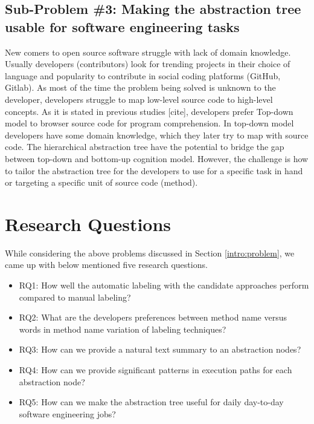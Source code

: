    

    \subsection{Sub-Problem \#3: Making the abstraction tree usable for software engineering tasks} 
    
    New comers to open source software struggle with lack of domain knowledge. Usually developers (contributors) look for trending projects in their choice of language and popularity to contribute in social coding platforms (GitHub, Gitlab). As most of the time the problem being solved is unknown to the developer, developers struggle to map low-level source code to high-level concepts. As it is stated in previous studies [cite], developers prefer Top-down model to browser source code for program comprehension. In top-down model developers have some domain knowledge, which they later try to map with source code. The hierarchical abstraction tree have the potential to bridge the gap between top-down and bottom-up cognition model. However, the challenge is how to tailor the abstraction tree for the developers to use for a specific task in hand or targeting a specific unit of source code (method). 
    
    
\section{Research Questions}   
\label{intro:research_questions}
While considering the above problems discussed in Section \ref{intro:problem}, we came up with below mentioned five research questions.
\begin{itemize}
    \item RQ1: How well the automatic labeling with the candidate approaches perform compared to manual labeling?
    \item RQ2: What are the developers preferences between method name versus words in method name variation of labeling techniques?
    \item RQ3: How can we provide a natural text summary to an abstraction nodes?
    \item RQ4: How can we provide significant patterns in execution paths for each abstraction node?
    \item RQ5: How can we make the abstraction tree useful for daily day-to-day software engineering jobs?
    
\end{itemize}

